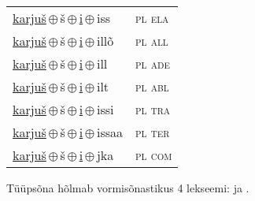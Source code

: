 \begin{minipage}{\textwidth}
\begin{sideways}
\begin{tabular}{l l}
\underline{karjuš}\,$\oplus$\,š\,$\oplus$\,\underline{i}\,$\oplus$\,iss & \textsc{ pl ela } \\
\underline{karjuš}\,$\oplus$\,š\,$\oplus$\,\underline{i}\,$\oplus$\,illõ & \textsc{ pl all } \\
\underline{karjuš}\,$\oplus$\,š\,$\oplus$\,\underline{i}\,$\oplus$\,ill & \textsc{ pl ade } \\
\underline{karjuš}\,$\oplus$\,š\,$\oplus$\,\underline{i}\,$\oplus$\,ilt & \textsc{ pl abl } \\
\underline{karjuš}\,$\oplus$\,š\,$\oplus$\,\underline{i}\,$\oplus$\,issi & \textsc{ pl tra } \\
\underline{karjuš}\,$\oplus$\,š\,$\oplus$\,\underline{i}\,$\oplus$\,issaa & \textsc{ pl ter } \\
\underline{karjuš}\,$\oplus$\,š\,$\oplus$\,\underline{i}\,$\oplus$\,jka & \textsc{ pl com } \\
\end{tabular}
\end{sideways}
\label{tab:tüüpsõnamall-karjušši}

\end{minipage}

 
\vspace{1em}
\noindent Tüüpsõna hõlmab vormisõnastikus 4 lekseemi:  ja .
